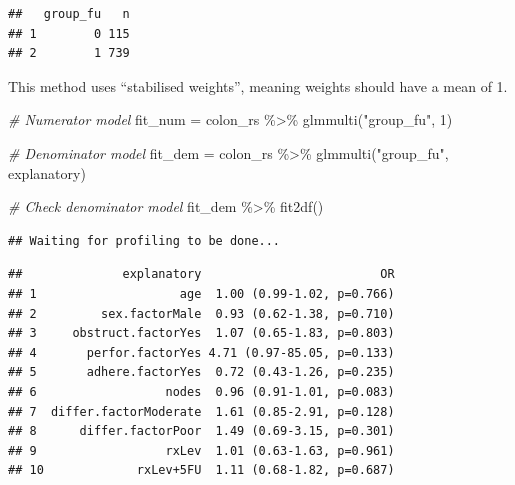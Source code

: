\documentclass[
]{book}
\newenvironment{Shaded}{\begin{snugshade}}{\end{snugshade}}
\newcommand{\CommentTok}[1]{\textcolor[rgb]{0.56,0.35,0.01}{\textit{#1}}}
\newcommand{\DecValTok}[1]{\textcolor[rgb]{0.00,0.00,0.81}{#1}}
\newcommand{\FunctionTok}[1]{\textcolor[rgb]{0.00,0.00,0.00}{#1}}
\newcommand{\NormalTok}[1]{#1}
\newcommand{\OtherTok}[1]{\textcolor[rgb]{0.56,0.35,0.01}{#1}}
\newcommand{\SpecialCharTok}[1]{\textcolor[rgb]{0.00,0.00,0.00}{#1}}
\newcommand{\StringTok}[1]{\textcolor[rgb]{0.31,0.60,0.02}{#1}}
\begin{document}
\begin{verbatim}
##   group_fu   n
## 1        0 115
## 2        1 739
\end{verbatim}

This method uses ``stabilised weights'', meaning weights should have a mean of 1.

\begin{Shaded}
\begin{Highlighting}[]
\CommentTok{\# Numerator model}
\NormalTok{fit\_num }\OtherTok{=}\NormalTok{ colon\_rs }\SpecialCharTok{\%\textgreater{}\%} 
  \FunctionTok{glmmulti}\NormalTok{(}\StringTok{"group\_fu"}\NormalTok{, }\DecValTok{1}\NormalTok{)}

\CommentTok{\# Denominator model}
\NormalTok{fit\_dem }\OtherTok{=}\NormalTok{ colon\_rs }\SpecialCharTok{\%\textgreater{}\%} 
  \FunctionTok{glmmulti}\NormalTok{(}\StringTok{"group\_fu"}\NormalTok{, explanatory)}

\CommentTok{\# Check denominator model}
\NormalTok{fit\_dem }\SpecialCharTok{\%\textgreater{}\%} 
  \FunctionTok{fit2df}\NormalTok{()}
\end{Highlighting}
\end{Shaded}

\begin{verbatim}
## Waiting for profiling to be done...
\end{verbatim}

\begin{verbatim}
##              explanatory                         OR
## 1                    age  1.00 (0.99-1.02, p=0.766)
## 2         sex.factorMale  0.93 (0.62-1.38, p=0.710)
## 3     obstruct.factorYes  1.07 (0.65-1.83, p=0.803)
## 4       perfor.factorYes 4.71 (0.97-85.05, p=0.133)
## 5       adhere.factorYes  0.72 (0.43-1.26, p=0.235)
## 6                  nodes  0.96 (0.91-1.01, p=0.083)
## 7  differ.factorModerate  1.61 (0.85-2.91, p=0.128)
## 8      differ.factorPoor  1.49 (0.69-3.15, p=0.301)
## 9                  rxLev  1.01 (0.63-1.63, p=0.961)
## 10             rxLev+5FU  1.11 (0.68-1.82, p=0.687)
\end{verbatim}
\end{document}
